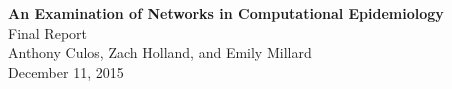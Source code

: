 \begin{titlepage}
\begin{center}
\vspace*{150px}
\LARGE{\textbf{An Examination of Networks in Computational Epidemiology} \\}
\vspace{12px}
\Large{Final Report\\}
\vspace{12px}
\large{Anthony Culos, Zach Holland, and Emily Millard \\}
\vspace{12px}
\large{December 11, 2015 \\}
\end{center}
\end{titlepage}